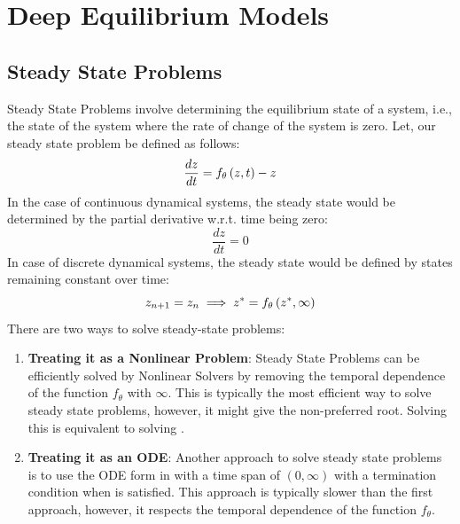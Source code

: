 \chapter{Deep Equilibrium Models}
\label{chapter:deep_equilibrium_models}

\section{Steady State Problems}
\label{sec:steady_state_problems}

Steady State Problems involve determining the equilibrium state of a system, i.e., the state of the system where the rate of change of the system is zero. Let, our steady state problem be defined as follows:
%
\begin{equation}
  \frac{dz}{dt} = f_\theta\left(z, t\right) - z \label{eq:steady_state_problem}
\end{equation}
%
In the case of continuous dynamical systems, the steady state would be determined by the partial derivative w.r.t. time being zero:
%
\begin{equation}
  \frac{dz}{dt} = 0 \label{eq:steady_state_continuous}
\end{equation}
%
In case of discrete dynamical systems, the steady state would be defined by states remaining constant over time:
%
\begin{equation}
  z_{n + 1} = z_n \implies z^* = f_\theta\left(z^*, \infty\right) \label{eq:steady_state_discrete}
\end{equation}
%
There are two ways to solve steady-state problems:
%
\begin{enumerate}
  \item \textbf{Treating it as a Nonlinear Problem}: Steady State Problems can be efficiently solved by Nonlinear Solvers by removing the temporal dependence of the function $f_\theta$ with $\infty$. This is typically the most efficient way to solve steady state problems, however, it might give the non-preferred root. Solving this is equivalent to solving .

  \item \textbf{Treating it as an ODE}: Another approach to solve steady state problems is to use the ODE form in  with a time span of $(0, \infty)$ with a termination condition when  is satisfied. This approach is typically slower than the first approach, however, it respects the temporal dependence of the function $f_\theta$.
\end{enumerate}
%

